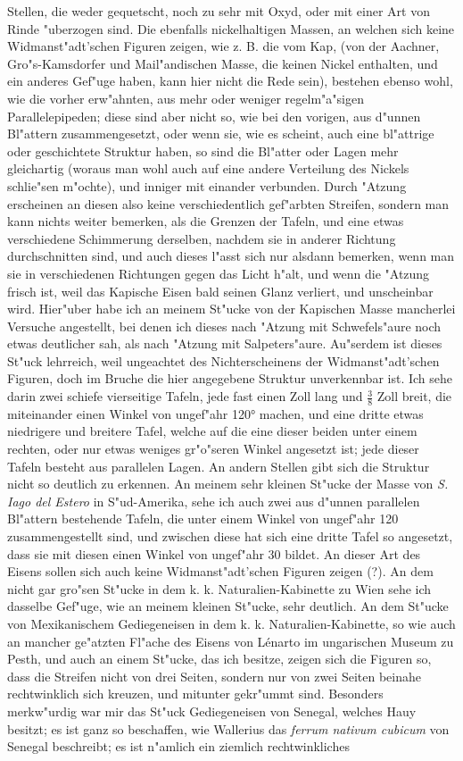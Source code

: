 \documentclass[a4paper, 11pt, oneside, polutonikogreek, german]{article}
\begin{document}
Stellen, die weder gequetscht, noch zu sehr mit Oxyd, oder mit einer Art von Rinde "uberzogen sind. Die ebenfalls nickelhaltigen Massen, an welchen sich keine Widmanst"adt'schen Figuren zeigen, wie z. B. die vom Kap, (von der Aachner, Gro"s-Kamsdorfer und Mail"andischen Masse, die keinen Nickel enthalten, und ein anderes Gef"uge haben, kann hier nicht die Rede sein), bestehen ebenso wohl, wie die vorher erw"ahnten, aus mehr oder weniger regelm"a"sigen Parallelepipeden; diese sind aber nicht so, wie bei den vorigen, aus d"unnen Bl"attern zusammengesetzt, oder wenn sie, wie es scheint, auch eine bl"attrige oder geschichtete Struktur haben, so sind die Bl"atter oder Lagen mehr gleichartig (woraus man wohl auch auf eine andere Verteilung des Nickels schlie"sen m"ochte), und inniger mit einander verbunden. Durch "Atzung erscheinen an diesen also keine verschiedentlich gef"arbten Streifen, sondern man kann nichts weiter bemerken, als die Grenzen der Tafeln, und eine etwas verschiedene Schimmerung derselben, nachdem sie in anderer Richtung durchschnitten sind, und auch dieses l"asst sich nur alsdann bemerken, wenn man sie in verschiedenen Richtungen gegen das Licht h"alt, und wenn die "Atzung frisch ist, weil das Kapische Eisen bald seinen Glanz verliert, und unscheinbar wird. Hier"uber habe ich an meinem St"ucke von der Kapischen Masse mancherlei Versuche angestellt, bei denen ich dieses nach "Atzung mit Schwefels"aure noch etwas deutlicher sah, als nach "Atzung mit Salpeters"aure. Au"serdem ist dieses St"uck lehrreich, weil ungeachtet des Nichterscheinens der Widmanst"adt'schen Figuren, doch im Bruche die hier angegebene Struktur unverkennbar ist. Ich sehe darin zwei schiefe vierseitige Tafeln, jede fast einen Zoll lang und $\mathfrak{\frac{3}{8}}$ Zoll breit, die miteinander einen Winkel von ungef"ahr 120° machen, und eine dritte etwas niedrigere und breitere Tafel, welche auf die eine dieser beiden unter einem rechten, oder nur etwas weniges gr"o"seren Winkel angesetzt ist; jede dieser Tafeln besteht aus parallelen Lagen. An andern Stellen gibt sich die Struktur nicht so deutlich zu erkennen. An meinem sehr kleinen St"ucke der Masse von \emph{S. Iago del Estero} in S"ud-Amerika, sehe ich auch zwei aus d"unnen parallelen Bl"attern bestehende Tafeln, die unter einem Winkel von ungef"ahr 120 zusammengestellt sind, und zwischen diese hat sich eine dritte Tafel so angesetzt, dass sie mit diesen einen Winkel von ungef"ahr 30 bildet. An dieser Art des Eisens sollen sich auch keine Widmanst"adt'schen Figuren zeigen (?). An dem nicht gar gro"sen St"ucke in dem k. k. Naturalien-Kabinette zu Wien sehe ich dasselbe Gef"uge, wie an meinem kleinen St"ucke, sehr deutlich. An dem St"ucke von Mexikanischem Gediegeneisen in dem k. k. Naturalien-Kabinette, so wie auch an mancher ge"atzten Fl"ache des Eisens von Lénarto im ungarischen Museum zu Pesth, und auch an einem St"ucke, das ich besitze, zeigen sich die Figuren so, dass die Streifen nicht von drei Seiten, sondern nur von zwei Seiten beinahe rechtwinklich sich kreuzen, und mitunter gekr"ummt sind. Besonders merkw"urdig war mir das St"uck Gediegeneisen von Senegal, welches Hauy besitzt; es ist ganz so beschaffen, wie Wallerius das \emph{ferrum nativum cubicum} von Senegal beschreibt; es ist n"amlich ein ziemlich rechtwinkliches 
\end{document}
